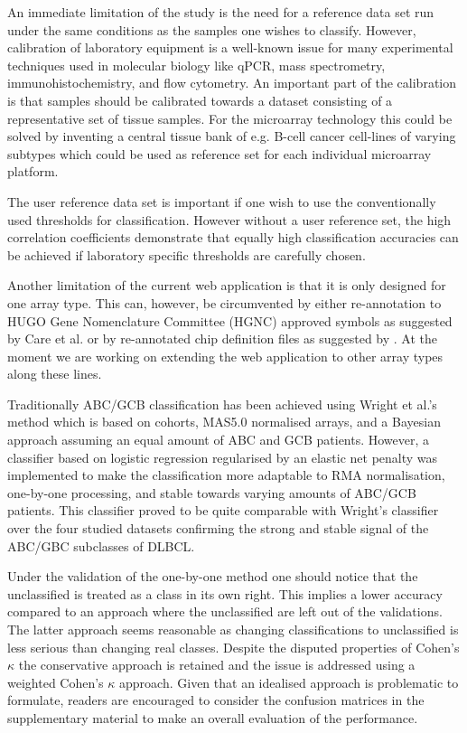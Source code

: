 \documentclass[10pt]{bmc_article}
\newenvironment{bmcformat}{\fussy\setboolean{publ}{true}}{\fussy}
\begin{document}
\begin{bmcformat}
An immediate limitation of the study is the need for a reference data set run under the same conditions as the samples one wishes to classify. However, calibration of laboratory equipment is a well-known issue for many experimental techniques used in molecular biology like qPCR, mass spectrometry, immunohistochemistry, and flow cytometry. An important part of the calibration is that samples should be calibrated towards a dataset consisting of a representative set of tissue samples. For the microarray technology this could be solved by inventing a central tissue bank of e.g. B-cell cancer cell-lines of varying subtypes which could be used as reference set for each individual microarray platform.

The user reference data set is important if one wish to use the conventionally used thresholds for classification. However without a user reference set, the high correlation coefficients demonstrate that equally high classification accuracies can be achieved if laboratory specific thresholds are carefully chosen.

Another limitation of the current web application is that it is only designed for one array type. This can, however, be circumvented by either re-annotation to HUGO Gene Nomenclature Committee (HGNC) approved symbols as suggested by Care et al. \cite{Care2013} or by re-annotated chip definition files as suggested by \cite{Dai2005}. At the moment we are working on extending the web application to other array types along these lines.

Traditionally ABC/GCB classification has been achieved using Wright et al.'s method \cite{Wright2003} which is based on cohorts, MAS5.0 normalised arrays, and a Bayesian approach assuming an equal amount of ABC and GCB patients. However, a classifier based on logistic regression regularised by an elastic net penalty was implemented to make the classification more adaptable to RMA normalisation, one-by-one processing, and stable towards varying amounts of ABC/GCB patients. This classifier proved to be quite comparable with Wright's classifier over the four studied datasets confirming the strong and stable signal of the ABC/GBC subclasses of DLBCL.

Under the validation of the one-by-one method one should notice that the unclassified is treated as a class in its own right. This implies a lower accuracy compared to an approach where the unclassified are left out of the validations. The latter approach seems reasonable as changing classifications to unclassified is less serious than changing real classes. Despite the disputed properties of Cohen's $\kappa$ the conservative approach is retained and the issue is addressed using a weighted Cohen's $\kappa$ approach. Given that an idealised approach is problematic to formulate, readers are encouraged to consider the confusion matrices in the supplementary material to make an overall evaluation of the performance.


\end{bmcformat}
\end{document}
